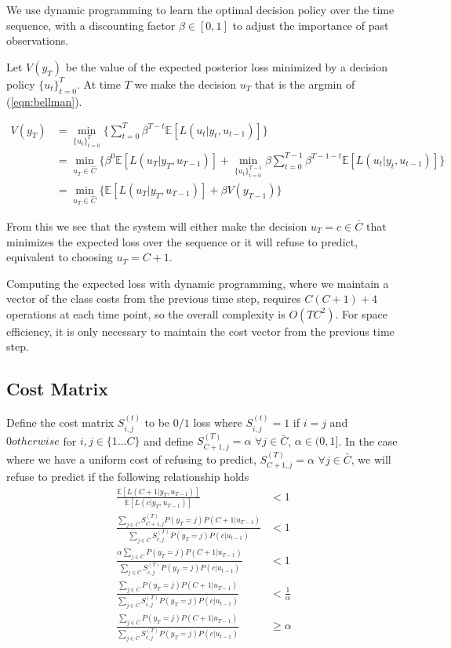 \documentclass[12pt,solutions]{article}
\newcommand{\E}{\mathbb{E}}
\begin{document}
We use dynamic programming to learn the optimal decision policy over the time sequence, with a discounting factor $\beta \in [0,1]$ to adjust the importance of past observations.

Let $V(y_T)$ be the value of the expected posterior loss minimized by a decision policy $\{u_t\}_{t=0}^{T}$. At time $T$ we make the decision $u_T$ that is the argmin of (\ref{eqn:bellman}).

\begin{align}
V(y_T) &= \min_{\{u_t\}_{t=0}^{T}} \Big\{ \sum_{t=0}^T \beta^{T-t}\E[L(u_t|y_t, u_{t-1})] \Big\}\\
&= \min_{u_T \in \hat{C}} \Big\{  \beta^{0}\E[L(u_T|y_T, u_{T-1})] + \min_{\{u_t\}_{t=0}^{T-1}} \beta \sum_{t=0}^{T-1} \beta^{T-1-t}\E[L(u_t|y_t, u_{t-1})] \Big\}\\
&= \min_{u_T \in \hat{C}} \Big\{  \E[L(u_T|y_T, u_{T-1})] + \beta V(y_{T-1})\Big\} \label{eqn:bellman}
\end{align}

From this we see that the system will either make the decision $u_T = c \in \bar{C}$ that minimizes the expected loss over the sequence or it will refuse to predict, equivalent to choosing $u_T = C+1$. 

Computing the expected loss with dynamic programming, where we maintain a vector of the class costs from the previous time step, requires $C(C+1)+4$ operations at each time point, so the overall complexity is $O(TC^2)$. For space efficiency, it is only necessary to maintain the cost vector from the previous time step.



\subsection{Cost Matrix}
Define the cost matrix $S^{(t)}_{i,j}$ to be $0/1$ loss where $S^{(t)}_{i,j} = 1$ if $i =j$ and $0 otherwise$ for $i,j \in \{1\ldots C\}$ and define $S^{(T)}_{C+1,j} = \alpha $ $\forall j \in \bar{C}$, $\alpha \in (0,1]$.
In the case where we have a uniform cost of refusing to predict, $S^{(T)}_{C+1,j} = \alpha $ $\forall j \in \bar{C}$, we will refuse to predict if the following relationship holds
\begin{align}
\frac{\E[L(C+1|y_T, u_{T-1})]}{\E[L(c|y_T, u_{T-1})]} &< 1\\
\frac{\sum_{j \in \bar{C}} S_{C+1,j}^{(T)} P(y_T=j)P(C+1|u_{T-1})}{\sum_{j \in \bar{C}} S_{c,j}^{(T)} P(y_T=j)P(c|u_{t-1})} &< 1\\
\frac{\alpha\sum_{j \in \bar{C}} P(y_T=j)P(C+1|u_{T-1})}{\sum_{j \in \bar{C}} S_{c,j}^{(T)} P(y_T=j)P(c|u_{t-1})} &< 1\\
\frac{\sum_{j \in \bar{C}} P(y_T=j)P(C+1|u_{T-1})}{\sum_{j \in \bar{C}} S_{c,j}^{(T)} P(y_T=j)P(c|u_{t-1})} &< \frac{1}{\alpha}\\
\frac{\sum_{j \in \bar{C}} P(y_T=j)P(C+1|u_{T-1})}{\sum_{j \in \bar{C}} S_{c,j}^{(T)} P(y_T=j)P(c|u_{t-1})} &\geq \alpha
\end{align}
\end{document}
